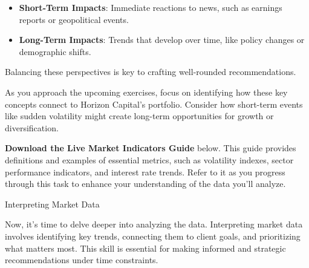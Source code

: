 \documentclass[11pt]{article}
\begin{document}
\begin{itemize}[leftmargin=1.5em, itemsep=2pt]
  \item \textbf{Short-Term Impacts}: Immediate reactions to news, such as
  earnings reports or geopolitical events.
  \item \textbf{Long-Term Impacts}: Trends that develop over time, like policy
  changes or demographic shifts.
\end{itemize}
Balancing these perspectives is key to crafting well-rounded recommendations.

As you approach the upcoming exercises, focus on identifying how these key
concepts connect to Horizon Capital's portfolio. Consider how short-term
events like sudden volatility might create long-term opportunities for growth
or diversification.

\textbf{Download the Live Market Indicators Guide} below. This guide provides
definitions and examples of essential metrics, such as volatility indexes,
sector performance indicators, and interest rate trends. Refer to it as you
progress through this task to enhance your understanding of the data you'll
analyze.\par\medskip


\newpage
{\fontsize{26}{30}\selectfont Interpreting Market Data}\par\bigskip

Now, it's time to delve deeper into analyzing the data. Interpreting market
data involves identifying key trends, connecting them to client goals, and
prioritizing what matters most. This skill is essential for making informed
and strategic recommendations under time constraints.

\end{document}
